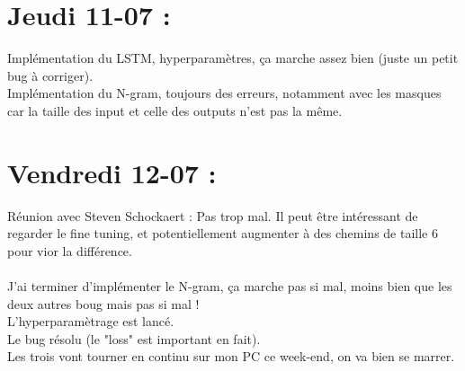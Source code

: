 \documentclass{article}
\begin{document}
\section*{Jeudi 11-07 :}
Implémentation du LSTM, hyperparamètres, ça marche assez bien (juste un petit bug à corriger).\\
Implémentation du N-gram, toujours des erreurs, notamment avec les masques car la taille des input et celle des outputs n'est pas la même.
\section*{Vendredi 12-07 :}
Réunion avec Steven Schockaert :
Pas trop mal.
Il peut être intéressant de regarder le fine tuning, et potentiellement augmenter à des chemins de taille 6 pour vior la différence.\\
\\
J'ai terminer d'implémenter le N-gram, ça marche pas si mal, moins bien que les deux autres boug mais pas si mal !\\
L'hyperparamètrage est lancé.\\
Le bug résolu (le "loss" est important en fait).\\
Les trois vont tourner en continu sur mon PC ce week-end, on va bien se marrer.
\end{document}
